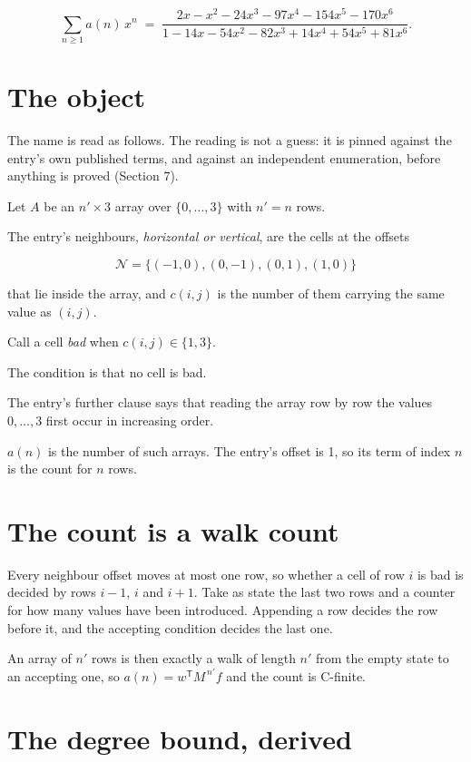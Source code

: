 \documentclass[11pt]{article}
\theoremstyle{definition}
\begin{document}
\[\sum_{n \ge 1} a(n)\,x^n \;=\; \frac{2x - x^{2} - 24x^{3} - 97x^{4} - 154x^{5} - 170x^{6}}{1 - 14x - 54x^{2} - 82x^{3} + 14x^{4} + 54x^{5} + 81x^{6}}.\]

\section{The object}

The name is read as follows. The reading is not a guess: it is pinned against the entry's own published terms, and against an independent enumeration, before anything is proved (Section 7).

Let $A$ be an $n' \times 3$ array over $\{0,\dots,3\}$ with $n' = n$ rows.

The entry's neighbours, {\itshape horizontal or vertical}, are the cells at the offsets

\[\mathcal{N} = \{(-1,0), (0,-1), (0,1), (1,0)\}\]

that lie inside the array, and $c(i,j)$ is the number of them carrying the same value as $(i,j)$.

Call a cell {\itshape bad} when $c(i,j) \in \{1, 3\}$.

The condition is that no cell is bad.

The entry's further clause says that reading the array row by row the values $0,\dots,3$ first occur in increasing order.

$a(n)$ is the number of such arrays. The entry's offset is 1, so its term of index $n$ is the count for $n$ rows.

\section{The count is a walk count}

Every neighbour offset moves at most one row, so whether a cell of row $i$ is bad is decided by rows $i-1$, $i$ and $i+1$. Take as state the last two rows and a counter for how many values have been introduced. Appending a row decides the row before it, and the accepting condition decides the last one.

An array of $n'$ rows is then exactly a walk of length $n'$ from the empty state to an accepting one, so $a(n) = w^{\mathsf T}M^{\,n'}f$ and the count is C-finite.

\section{The degree bound, derived}
\end{document}
